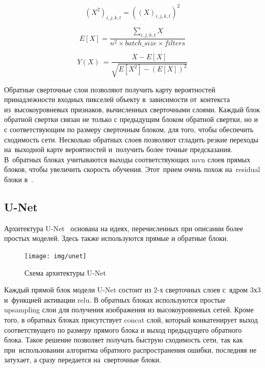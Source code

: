 \begin{equation}
\label{eq:mvn_squared_batch}
(X^{2})_{i,j,k,t}=((X)_{i,j,k,t})^{2}
\end{equation}

\begin{equation}
\label{eq:mvn_expected_value}
E[X]=\frac{
  \sum_{i,j,k,t}X
}{
  n^{2}\times{}batch\_size\times{}filters
}
\end{equation} 

\begin{equation}
\label{eq:mvn}
Y(X)\ = \frac{
  X - E[X]
}{\sqrt{
  E[X^{2}] - (E[X])^2
}}
\end{equation}

Обратные сверточные слои 
позволяют получить карту вероятностей принадлежности 
входных пикселей объекту в~зависимости от~контекста 
из~высокоуровневых признаков, вычисленных сверточными слоями. 
Каждый блок обратной свертки связан не только с предыдущим блоком 
обратной свертки, но и с соответствующим по размеру сверточным блоком, 
для того, чтобы обеспечить сходимость сети. Несколько обратных слоев 
позволяют сгладить резкие переходы на~выходной карте вероятностей 
и~получить более точные предсказания. В~обратных блоках учитываются 
выходы соответствующих mvn слоев прямых блоков, чтобы увеличить 
скорость обучения. Этот~прием очень похож на~residual блоки в~\cite{resnet}.

\subsection{U-Net}

Архитектура U-Net~\cite{unet} основана на идеях, 
перечисленных при описании более простых моделей. 
Здесь также используются прямые и обратные блоки. 

\begin{figure}[hb]
  \texttt{[image: img/unet]}
  \caption{Схема архитектуры U-Net}
\end{figure}

Каждый прямой блок модели U-Net состоит из 2-х сверточных слоев 
с~ядром 3х3 и~функцией активации relu. В обратных блоках используются 
простые upsampling слои для получения изображения из высокоуровневых сетей. 
Кроме того, в обратных блоках присутствует concat слой, который конкатенирует 
выход соответствущего по размеру прямого блока и выход предыдущего обратного блока. 
Такое решение позволяет получать быструю сходимость сети, так как при~использовании 
алгоритма обратного распространения ошибки, последняя не затухает, а сразу передается 
на~сверточные блоки. 


